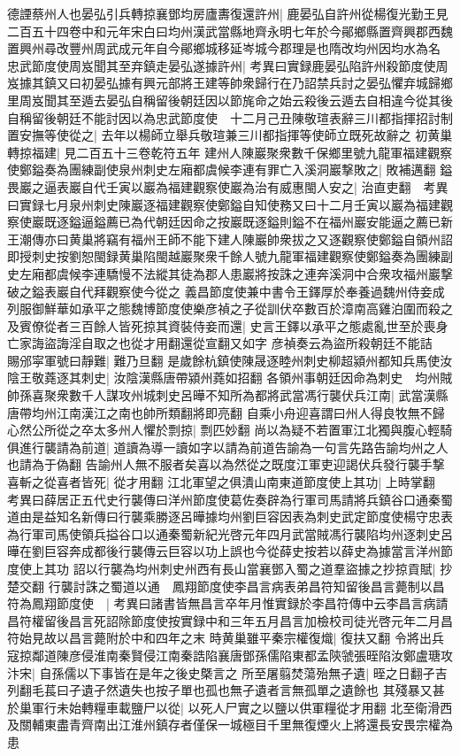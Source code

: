 德諲蔡州人也晏弘引兵轉掠襄鄧均房廬夀復還許州|{
	鹿晏弘自許州從楊復光勤王見二百五十四卷中和元年宋白曰均州漢武當縣地齊永明七年於今鄖鄉縣置齊興郡西魏置興州尋改豐州周武成元年自今鄖鄉城移延岑城今郡理是也隋改均州因均水為名}
忠武節度使周岌聞其至弃鎮走晏弘遂據許州|{
	考異曰實録鹿晏弘陷許州殺節度使周岌據其鎮又曰初晏弘據有興元部將王建等帥衆歸行在乃詔禁兵討之晏弘懼弃城歸鄉里周岌聞其至遁去晏弘自稱留後朝廷因以節旄命之始云殺後云遁去自相違今從其後}
自稱留後朝廷不能討因以為忠武節度使　十二月己丑陳敬瑄表辭三川都指揮招討制置安撫等使從之|{
	去年以楊師立舉兵敬瑄兼三川都指揮等使師立既死故辭之}
初黄巢轉掠福建|{
	見二百五十三卷乾符五年}
建州人陳巖聚衆數千保鄉里號九龍軍福建觀察使鄭鎰奏為團練副使泉州刺史左廂都虞候李連有罪亡入溪洞巖撃敗之|{
	敗補邁翻}
鎰畏巖之逼表巖自代壬寅以巖為福建觀察使巖為治有威惠閩人安之|{
	治直吏翻　考異曰實録七月泉州刺史陳巖逐福建觀察使鄭鎰自知使務又曰十二月壬寅以巖為福建觀察使巖既逐鎰逼鎰薦已為代朝廷因命之按巖既逐鎰則鎰不在福州巖安能逼之薦已新王潮傳亦曰黄巢將竊有福州王師不能下建人陳巖帥衆拔之又逐觀察使鄭鎰自領州詔即授刺史按劉恕閩録黄巢陷閩越巖聚衆千餘人號九龍軍福建觀察使鄭鎰奏為團練副史左廂都虞候李連驕慢不法縱其徒為郡人患巖將按誅之連奔溪洞中合衆攻福州巖撃破之鎰表巖自代拜觀察使今從之}
義昌節度使兼中書令王鐸厚於奉養過魏州侍妾成列服御鮮華如承平之態魏博節度使樂彦禎之子從訓伏卒數百於漳南高雞泊圍而殺之及賓僚從者三百餘人皆死掠其資裝侍妾而還|{
	史言王鐸以承平之態處亂世至於喪身亡家誨盜誨淫自取之也從才用翻還從宣翻又如字}
彦禎奏云為盜所殺朝廷不能詰　賜邠寜軍號曰靜難|{
	難乃旦翻}
是歲餘杭鎮使陳晟逐睦州刺史柳超潁州都知兵馬使汝陰王敬蕘逐其刺史|{
	汝陰漢縣唐帶潁州蕘如招翻}
各領州事朝廷因命為刺史　均州賊帥孫喜聚衆數千人謀攻州城刺史呂曄不知所為都將武當馮行襲伏兵江南|{
	武當漢縣唐帶均州江南漢江之南也帥所類翻將即亮翻}
自乘小舟迎喜謂曰州人得良牧無不歸心然公所從之卒太多州人懼於剽掠|{
	剽匹妙翻}
尚以為疑不若置軍江北獨與腹心輕騎俱進行襲請為前道|{
	道讀為導一讀如字以請為前道告諭為一句言先路告諭均州之人也請為于偽翻}
告諭州人無不服者矣喜以為然從之既度江軍吏迎謁伏兵發行襲手撃喜斬之從喜者皆死|{
	從才用翻}
江北軍望之俱潰山南東道節度使上其功|{
	上時掌翻　考異曰薛居正五代史行襲傳曰洋州節度使葛佐奏辟為行軍司馬請將兵鎮谷口通秦蜀道由是益知名新傳曰行襲乘勝逐呂曄據均州劉巨容因表為刺史武定節度使楊守忠表為行軍司馬使領兵搤谷口以通秦蜀新紀光啓元年四月武當賊馮行襲陷均州逐刺史呂曄在劉巨容奔成都後行襲傳云巨容以功上誤也今從薛史按若以薛史為據當言洋州節度使上其功}
詔以行襲為均州刺史州西有長山當襄鄧入蜀之道羣盜據之抄掠貢賦|{
	抄楚交翻}
行襲討誅之蜀道以通　鳳翔節度使李昌言病表弟昌符知留後昌言薨制以昌符為鳳翔節度使　|{
	考異曰諸書皆無昌言卒年月惟實録於李昌符傳中云李昌言病請昌符權留後昌言死詔除節度使按實録中和三年五月昌言加檢校司徒光啓元年二月昌符始見故以昌言薨附於中和四年之末}
時黄巢雖平秦宗權復熾|{
	復扶又翻}
令將出兵寇掠鄰道陳彦侵淮南秦賢侵江南秦誥陷襄唐鄧孫儒陷東都孟陝虢張晊陷汝鄭盧瑭攻汴宋|{
	自孫儒以下事皆在是年之後史槩言之}
所至屠翦焚蕩殆無孑遺|{
	晊之日翻孑吉列翻毛萇曰孑遺孑然遺失也按孑單也孤也無孑遺者言無孤單之遺餘也}
其殘暴又甚於巢軍行未始轉糧車載鹽尸以從|{
	以死人尸實之以鹽以供軍糧從才用翻}
北至衛滑西及關輔東盡青齊南出江淮州鎮存者僅保一城極目千里無復煙火上將還長安畏宗權為患

